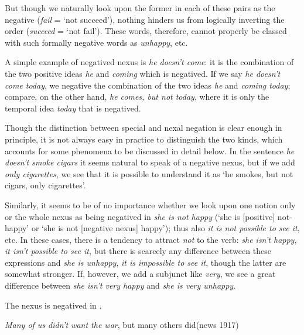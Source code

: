 \phantom{a}

But though we naturally look upon the former in each of these pairs as the negative (\textit{fail} = `not succeed'), nothing hinders us from logically inverting the order (\textit{succeed} = `not fail'). These words, therefore, cannot properly be classed with such formally negative words as \textit{unhappy}, etc.

A simple example of negatived nexus is \textit{he doesn't come}: it is the combination of the two positive ideas \textit{he} and \textit{coming} which is negatived. If we say \textit{he doesn't come today}, we negative the combination of the two ideas \textit{he} and \textit{coming today}; compare, on the other hand, \textit{he comes, but not today}, where it is only the temporal idea \textit{today} that is negatived.

Though the distinction between special and nexal negation is clear enough in principle, it is not always easy in practice to distinguish the two kinds, which accounts for some phenomena to be discussed in detail below. In the sentence \textit{he doesn't smoke cigars} it seems natural to speak of a negative nexus, but if we add \textit{only cigarettes}, we see that it is possible to understand it as `he smokes, but not cigars, only cigarettes'.

Similarly, it seems to be of no importance whether we look upon one notion only or the whole nexus as being negatived in \textit{she is not happy} (`she is [positive] not-happy' or `she is not [negative nexus] happy'); %
thus also \textit{it is not possible to see it}, etc. In these cases, there is a tendency to attract \textit{not} to the verb: \textit{she isn't happy}, \textit{it isn't possible to see it}, but there is scarcely any difference between these expressions and \textit{she is unhappy}, \textit{it is impossible to see it}, though the latter are somewhat stronger. If, however, we add a subjunct like \textit{very}, we see a great difference between \textit{she isn't very happy} and \textit{she is very unhappy}.

The nexus is negatived in .

\ea \label{ex:05-01}
\textit{Many of us didn't want the war}, but many others did\hfill(news 1917)
\z

